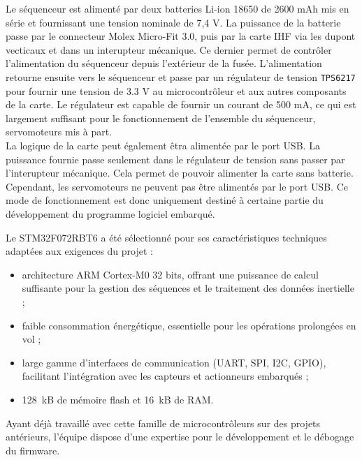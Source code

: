 \label{subsubsubsec:sequenceur_alimentation}
Le séquenceur est alimenté par deux batteries Li-ion 18650 de 2600 mAh mis en série et fournissant une tension nominale de 7,4 V.
La puissance de la batterie passe par le connecteur Molex Micro-Fit 3.0, puis par la carte \acrshort{IHF} via les dupont
vecticaux et dans un interupteur mécanique. Ce dernier permet de contrôler l'alimentation du séquenceur depuis l'extérieur de la
fusée. L'alimentation retourne ensuite vers le séquenceur et passe par un régulateur de tension \verb|TPS6217| pour fournir une
tension de 3.3 V au microcontrôleur et aux autres composants de la carte. Le régulateur est capable de fournir un courant de
500 mA, ce qui est largement suffisant pour le fonctionnement de l'ensemble du séquenceur, servomoteurs mis à part.\\

La logique de la carte peut également êtra alimentée par le port \acrshort{USB}. La puissance fournie passe seulement dans le
régulateur de tension sans passer par l'interupteur mécanique. Cela permet de pouvoir alimenter la carte sans batterie. Cependant,
les servomoteurs ne peuvent pas être alimentés par le port \acrshort{USB}. Ce mode de fonctionnement est donc uniquement destiné
à certaine partie du développement du programme logiciel embarqué. 

Le STM32F072RBT6 a été sélectionné pour ses caractéristiques techniques adaptées aux exigences du projet :
\begin{itemize}
    \item architecture ARM Cortex-M0 32 bits, offrant une puissance de calcul suffisante pour la gestion des séquences et
    le traitement des données inertielle ;
    \item faible consommation énergétique, essentielle pour les opérations prolongées en vol ;
    \item large gamme d’interfaces de communication (\acrshort{UART}, \acrshort{SPI}, \acrshort{I2C}, \acrshort{GPIO}),
    facilitant l’intégration avec les capteurs et actionneurs embarqués ;
    \item 128~kB de mémoire flash et 16~kB de \acrshort{RAM}.
\end{itemize}

Ayant déjà travaillé avec cette famille de microcontrôleurs sur des projets antérieurs, l’équipe dispose d’une expertise
pour le développement et le débogage du firmware.

